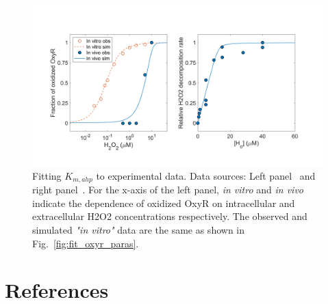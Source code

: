 \documentclass[10pt]{article}
\begin{document}
\begin{figure}[H]
\centering
  \includegraphics[width=0.85\linewidth]{fitting_results_Kmahp.png}
  \caption{Fitting $K_{m,ahp}$ to experimental data. Data sources: Left panel~\cite{aaslund1999regulation} and right panel~\cite{seaver2001hydrogen}. For the x-axis of the left panel, \textit{in vitro} and \textit{in vivo} indicate the dependence of oxidized OxyR on intracellular and extracellular H2O2 concentrations respectively. The observed and simulated \textit{"in vitro"} data are the same as shown in Fig.~\ref{fig:fit_oxyr_paras}.}
  \label{fig:fit_kmahp}
\end{figure}



\clearpage
\section{References}
 

\end{document}
